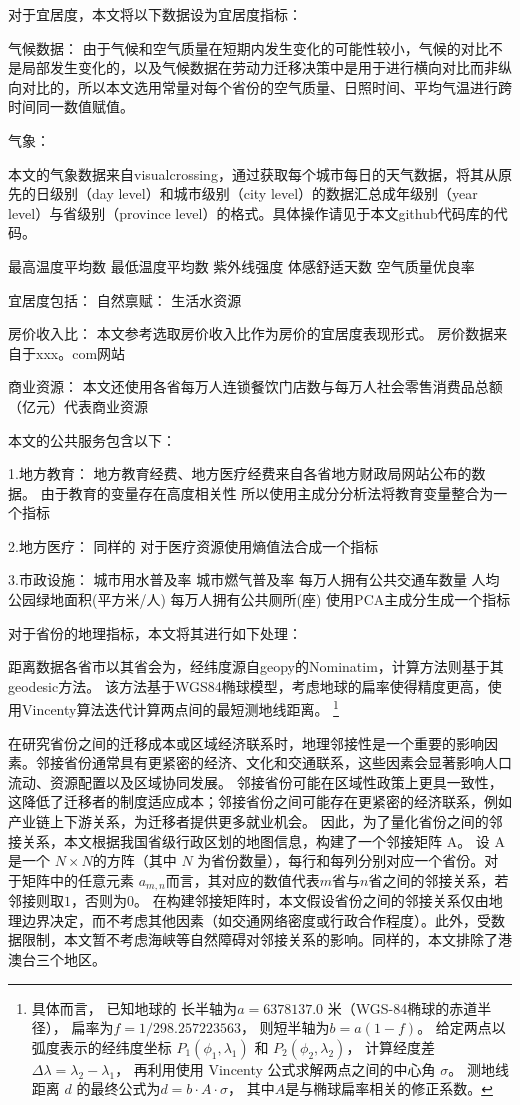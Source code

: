 \documentclass[
  a4paper,
  zihao=-4,
  fontset=mac,
  AutoFakeBold,
  AutoFakeSlant,
  oneside]{ctexbook}
\let\oldfootnote\footnote
\renewcommand{\footnote}[1]{%
  \oldfootnote{\setstretch{1.5}#1}%
}
\begin{document}
对于宜居度，本文将以下数据设为宜居度指标：

气候数据：
由于气候和空气质量在短期内发生变化的可能性较小，气候的对比不是局部发生变化的，以及气候数据在劳动力迁移决策中是用于进行横向对比而非纵向对比的，所以本文选用常量对每个省份的空气质量、日照时间、平均气温进行跨时间同一数值赋值。

气象：

本文的气象数据来自visualcrossing，通过获取每个城市每日的天气数据，将其从原先的日级别（day level）和城市级别（city level）的数据汇总成年级别（year level）与省级别（province level）的格式。具体操作请见于本文github代码库的代码。

最高温度平均数 最低温度平均数 紫外线强度 体感舒适天数  空气质量优良率


宜居度包括：
自然禀赋：
生活水资源


房价收入比：
本文参考\textcite{LiHuiFangJieFangJieShouRuBiYuLiuDongRenKouChangQiJuLiuYiYuanLaiZiLiuDongRenKouDeWeiGuanZhengJu2019}选取房价收入比作为房价的宜居度表现形式。
房价数据来自于xxx。com网站

商业资源：
本文还使用各省每万人连锁餐饮门店数与每万人社会零售消费品总额（亿元）代表商业资源


本文的公共服务包含以下：

1.地方教育：
地方教育经费、地方医疗经费来自各省地方财政局网站公布的数据。
由于教育的变量存在高度相关性
所以使用主成分分析法将教育变量整合为一个指标

2.地方医疗：
同样的
对于医疗资源使用熵值法合成一个指标

3.市政设施：
城市用水普及率
城市燃气普及率
每万人拥有公共交通车数量
人均公园绿地面积(平方米/人)
每万人拥有公共厕所(座)
使用PCA主成分生成一个指标


对于省份的地理指标，本文将其进行如下处理：

距离数据各省市以其省会为，经纬度源自geopy的Nominatim，计算方法则基于其geodesic方法。
该方法基于WGS84椭球模型，考虑地球的扁率使得精度更高，使用Vincenty算法迭代计算两点间的最短测地线距离。
\footnote{
具体而言，
已知地球的
长半轴为$a = 6378137.0$ 米（WGS-84椭球的赤道半径），
扁率为$f = 1 / 298.257223563$，
则短半轴为$b = a(1 - f)$。
给定两点以弧度表示的经纬度坐标 $ P_1(\phi_1, \lambda_1) $ 和 $ P_2(\phi_2, \lambda_2) $，
计算经度差$\Delta\lambda = \lambda_2 - \lambda_1$，
再利用使用 Vincenty 公式求解两点之间的中心角 $\sigma$。
测地线距离 $d$ 的最终公式为$d = b \cdot A \cdot \sigma$，
其中$A$是与椭球扁率相关的修正系数。
}

在研究省份之间的迁移成本或区域经济联系时，地理邻接性是一个重要的影响因素。邻接省份通常具有更紧密的经济、文化和交通联系，这些因素会显著影响人口流动、资源配置以及区域协同发展。
邻接省份可能在区域性政策上更具一致性，这降低了迁移者的制度适应成本；邻接省份之间可能存在更紧密的经济联系，例如产业链上下游关系，为迁移者提供更多就业机会。
因此，为了量化省份之间的邻接关系，本文根据我国省级行政区划的地图信息，构建了一个邻接矩阵 A。
设 A 是一个 $N \times N$的方阵（其中 $N$ 为省份数量），每行和每列分别对应一个省份。对于矩阵中的任意元素 $a_{m,n}$而言，其对应的数值代表$m$省与$n$省之间的邻接关系，若邻接则取$1$，否则为$0$。
在构建邻接矩阵时，本文假设省份之间的邻接关系仅由地理边界决定，而不考虑其他因素（如交通网络密度或行政合作程度）。此外，受数据限制，本文暂不考虑海峡等自然障碍对邻接关系的影响。同样的，本文排除了港澳台三个地区。
\end{document}
